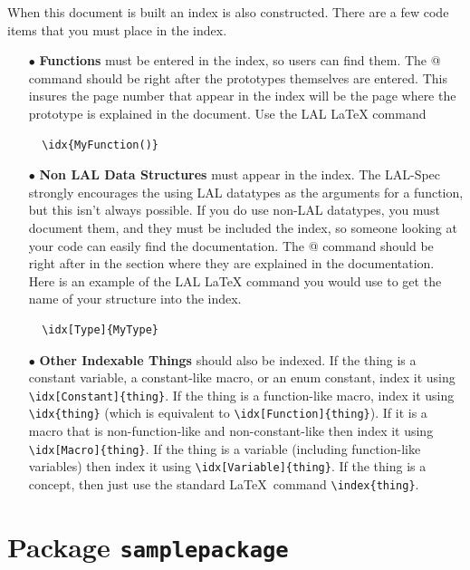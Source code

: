 \documentclass[oneside]{book}
\begin{document}
When this  document is built an index is also constructed. There are a few
code items that you must place in the index.
\begin{itemize}
  \item[$\bullet$] {\bf Functions} must be entered in the index, so
   users can find them. The \verb@\idx{}@ command should be right
   after the prototypes themselves are entered.  This insures the page
   number that appear in the index will be the page where the
   prototype is explained in the document.
   Use the LAL {\LaTeX} command
  \begin{verbatim}
  \idx{MyFunction()}
  \end{verbatim}
  \vspace*{-0.041in}
  \item[$\bullet$] {\bf Non LAL Data Structures}  must appear in the index.
  The LAL-Spec strongly encourages the using  LAL datatypes as the
  arguments for a function, but this isn't always possible. If you do
  use non-LAL datatypes, you must document them, and they must be
  included the index, so someone looking at your code can easily find
  the documentation.  The \verb@\idx[Type]{}@ command should be right after
  in the section where they are explained in the documentation.
  Here is an example of the LAL {\LaTeX} command you would use to get the
  name of your structure into the index.
  \begin{verbatim}
  \idx[Type]{MyType}
  \end{verbatim}
  \vspace*{-0.041in}
  \item[$\bullet$] {\bf Other Indexable Things} should also be indexed.
  If the thing is a constant variable, a constant-like macro, or an enum
  constant, index it using \verb&\idx[Constant]{thing}&.  If the thing is
  a function-like macro, index it using \verb&\idx{thing}& (which is equivalent
  to \verb&\idx[Function]{thing}&).  If it is a macro that is non-function-like
  and non-constant-like then index it using \verb&\idx[Macro]{thing}&.  If the
  thing is a variable (including function-like variables) then index it using
  \verb&\idx[Variable]{thing}&.  If the thing is a concept, then just use the
  standard \LaTeX\ command \verb&\index{thing}&.
\end{itemize}


\chapter{Package {\texttt {samplepackage}}}
\label{c:SamplePackage}
\end{document}
